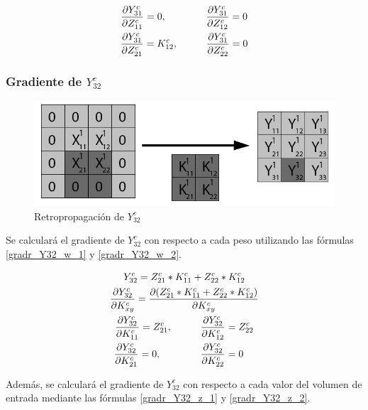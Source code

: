 \begin{gather}
	\frac{\partial Y^c_{31}}{\partial Z^c_{11}} = 0, \hspace{14mm} \frac{\partial Y^c_{31}}{\partial Z^c_{12}} = 0 \label{gradr_Y31_z_1} \\
	\frac{\partial Y^c_{31}}{\partial Z^c_{21}} = K^c_{12}, \hspace{10mm} \frac{\partial Y^c_{31}}{\partial Z^c_{22}} = 0 \label{gradr_Y31_z_2}
\end{gather}


\subsubsection{Gradiente de $Y^c_{32}$}

\begin{figure}[H]
	\centering
	\includegraphics[width=0.8\linewidth]{imagenes/conv_back_padding_8.jpg} 
	\caption{Retropropagación de $Y^c_{32}$}
\end{figure}

Se calculará el gradiente de $Y^c_{32}$ con respecto a cada peso utilizando las fórmulas \ref{gradr_Y32_w_1} y \ref{gradr_Y32_w_2}.

\begin{gather}
	Y^c_{32} = Z^c_{21} * K^c_{11} + Z^c_{22} * K^c_{12} \\
	\frac{\partial Y^c_{32}}{\partial K^c_{xy}} = \frac{\partial (Z^c_{21} * K^c_{11} + Z^c_{22} * K^c_{12})}{\partial K^c_{xy}} \\
	\frac{\partial Y^c_{32}}{\partial K^c_{11}} = Z^c_{21}, \hspace{10mm} \frac{\partial Y^c_{32}}{\partial K^c_{12}} = Z^c_{22} \label{gradr_Y32_w_1} \\
	\frac{\partial Y^c_{32}}{\partial K^c_{21}} = 0, \hspace{14mm} \frac{\partial Y^c_{32}}{\partial K^c_{22}} = 0 \hspace{4mm} \label{gradr_Y32_w_2}
\end{gather}

Además, se calculará el gradiente de $Y^c_{32}$ con respecto a cada valor del volumen de entrada mediante las fórmulas \ref{gradr_Y32_z_1} y \ref{gradr_Y32_z_2}.


